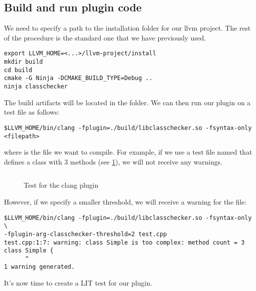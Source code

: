 \subsection{Build and run plugin code}
We need to specify a path to the installation folder for our llvm project. The
rest of the procedure is the standard one that we have previously used. 
\begin{adjustwidth}{0em}{0em}
\begin{verbatim}
export LLVM_HOME=<...>/llvm-project/install
mkdir build
cd build
cmake -G Ninja -DCMAKE_BUILD_TYPE=Debug ..
ninja classchecker
\end{verbatim}
\end{adjustwidth}
The build artifacts will be located in the  folder. We can then
run our plugin on a test file as follows: 
\begin{adjustwidth}{0em}{0em}
\begin{verbatim}
$LLVM_HOME/bin/clang -fplugin=./build/libclasschecker.so -fsyntax-only <filepath>
\end{verbatim}
\end{adjustwidth}
where  is the file we want to compile. For example, if we
use a test file named  that defines a class with 3 methods
(see \cref{lis:ch4:ClassComplexityChecker:SimpeTest3}), we will not receive any
warnings. 
\begin{figure}[H]
  \inputminted{c++}{src/part1/ch4_baselibs/classcomplexity/test.cpp}
  \caption{Test for the clang plugin}
  \label{lis:ch4:ClassComplexityChecker:SimpeTest3}
\end{figure}
However, if we specify a smaller threshold, we will receive a warning for the file:
\begin{adjustwidth}{0em}{0em}
\begin{verbatim}
$LLVM_HOME/bin/clang -fplugin=./build/libclasschecker.so -fsyntax-only \
-fplugin-arg-classchecker-threshold=2 test.cpp
test.cpp:1:7: warning: class Simple is too complex: method count = 3
class Simple {
      ^
1 warning generated.
\end{verbatim}
\end{adjustwidth}
It's now time to create a LIT test for our plugin.

